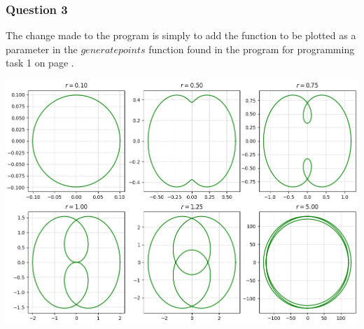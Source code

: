 \documentclass[12pt, a4paper]{article}
\begin{document}
\subsubsection*{Question 3}

The change made to the program is simply to add the function to be plotted as a parameter in the $generate$\textunderscore$points$ function found in the program for programming task 1 on page \pageref{programmingtask1}.
\vspace{0.1cm}\\
\begin{minipage}{\textwidth}
	\includegraphics[width=\linewidth]{q3_fig1}
	\label{q3_fig1}
\end{minipage}
\renewcommand\labelitemi{{\boldmath$\cdot$}} %
\end{document}
